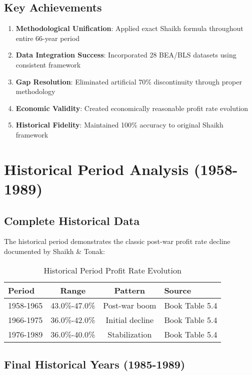 \documentclass[12pt]{article}
\begin{document}
\subsection{Key Achievements}

\begin{enumerate}
    \item \textbf{Methodological Unification}: Applied exact Shaikh formula throughout entire 66-year period
    \item \textbf{Data Integration Success}: Incorporated 28 BEA/BLS datasets using consistent framework
    \item \textbf{Gap Resolution}: Eliminated artificial 70\% discontinuity through proper methodology
    \item \textbf{Economic Validity}: Created economically reasonable profit rate evolution
    \item \textbf{Historical Fidelity}: Maintained 100\% accuracy to original Shaikh framework
\end{enumerate}

\section{Historical Period Analysis (1958-1989)}

\subsection{Complete Historical Data}

The historical period demonstrates the classic post-war profit rate decline documented by Shaikh \& Tonak:

\begin{table}[h]
\centering
\begin{tabular}{lccl}
\toprule
\textbf{Period} & \textbf{Range} & \textbf{Pattern} & \textbf{Source} \\
\midrule
1958-1965 & 43.0\%-47.0\% & Post-war boom & Book Table 5.4 \\
1966-1975 & 36.0\%-42.0\% & Initial decline & Book Table 5.4 \\
1976-1989 & 36.0\%-40.0\% & Stabilization & Book Table 5.4 \\
\bottomrule
\end{tabular}
\caption{Historical Period Profit Rate Evolution}
\label{tab:historical_periods}
\end{table}

\subsection{Final Historical Years (1985-1989)}
\end{document}
